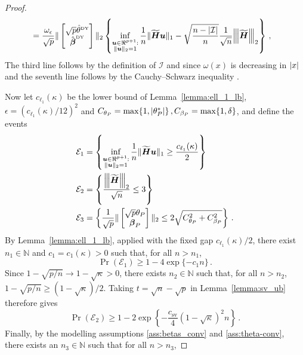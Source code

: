 \documentclass{article}
\makeatletter
\theoremstyle{definition}
\newcommand{\vnorm}[1]{%
	\ensuremath{%
		\if@display
		\left\| #1 \right\|
		\else
		\| #1 \|
		\fi
	}%
}
\newcommand{\abs}[1]{%
	\ensuremath{%
		\if@display
		\left| #1 \right|
		\else
		\lvert #1 \rvert
		\fi
	}%
}
\newcommand{\mnorm}[1]{{\left\vert\kern-0.25ex\left\vert\kern-0.25ex\left\vert #1
		\right\vert\kern-0.25ex\right\vert\kern-0.25ex\right\vert}}
\newcommand*{\bb}{\boldsymbol}
\newcommand{\betady}{\ensuremath{\hat{\bbeta}^{\textrm{\tiny DY}}}}
\newcommand{\thetady}{\ensuremath{\hat{\theta}^{\textrm{\tiny DY}}}}
\def\bH {\bb{H}}
\def\bu{\bb{u}}
\def\bbeta{\bb{\beta}}
\def\bH{\bb{H}}
\makeatother
\begin{document}
\begin{bibunit}
\begin{proof}
\begin{equation}
\begin{aligned}
		&=  \frac{\omega_\epsilon}{\sqrt{p}} \vnorm{\begin{bmatrix} \sqrt{p} \thetady \\ \betady \end{bmatrix}}_2  \left\{ \underset{\substack{\bu \in \Re^{p+1}: \\ \vnorm{\bu}_2  = 1}}{\inf} \, \frac{1}{n} \vnorm{\widetilde{\bH} \bu}_1 -  \sqrt{\frac{n - \abs{\mathcal I}}{n}} \frac{1}{\sqrt{n}}\mnorm{\widetilde{\bH}}_2 \right\} \,,
	\end{aligned}
	\end{equation}
	The third line follows by the definition of $\mathcal{I}$ and since $\omega(x)$ is decreasing in $\abs{x}$ and the seventh line follows
	by the Cauchy--Schwarz inequality \citep[Theorem~1.37(d)]{rudin+etal:1976}.

	Now let $c_{\ell_1}(\kappa)$ be the lower bound of Lemma~\ref{lemma:ell_1_lb}, $\epsilon = (c_{\ell_1}(\kappa) / 12)^2$ and $C_{\theta_P} = \max \{1,\abs{\theta_P^*}\}\,, C_{\beta_P} = \max\{1, \delta\}$, and define the events
	$$
	\begin{aligned}
		\mathcal{E}_1 &= \left\{ \underset{\substack{\bu \in \Re^{p+1}: \\
		\vnorm{\bu}_2 = 1}}{\inf} \,\frac{1}{n} \vnorm{\widetilde{\bH} \bu}_1 \geq \frac{c_{\ell_1}(\kappa)}{2}\right\} \\
		\mathcal{E}_2 &= \left\{ \frac{\mnorm{\widetilde{\bH}}_2}{\sqrt{n}} \leq 3 \right\} \\
		\mathcal{E}_3 &= \left\{ \frac{1}{\sqrt{p}} \vnorm{\begin{bmatrix}\sqrt{p}\theta_P \\ \bbeta_P \end{bmatrix}}_2 \leq 2 \sqrt{C_{\theta_P}^2 + C_{\beta_P}^2} \right\}\,.
	\end{aligned}
	$$
	By Lemma~\ref{lemma:ell_1_lb}, applied with the fixed gap
	$c_{\ell_1}(\kappa)/2$, there exist
	$n_1\in\mathbb N$ and $c_1=c_1(\kappa)>0$ such that, for all
	$n>n_1$,
	$$
		\Pr(\mathcal E_1)
		\geq
		1-4\exp\{-c_1n\}\,.
	$$
	Since
	$
		1-\sqrt{p/n}
		\to
		1-\sqrt\kappa
		>0
	$,
	there exists $n_2\in\mathbb N$ such that, for all $n>n_2$,
	$
		1-\sqrt{p/n}
		\geq
		(1-\sqrt\kappa)/2
	$.
	Taking $t=\sqrt n-\sqrt p$ in
	Lemma~\ref{lemma:sv_ub} therefore gives
	$$
		\Pr(\mathcal E_2)
		\geq
		1
		-
		2\exp\left\{
			-\frac{c_{\mathrm{sv}}}{4}
			(1-\sqrt\kappa)^2n
		\right\}\,.
	$$
	Finally, by the modelling assumptions \ref{ass:betas_conv} and \ref{ass:theta-conv}, there exists an $n_3 \in \mathbb{N}$ such that for all $n > n_3$,

\end{proof}
\end{bibunit}
\end{document}
